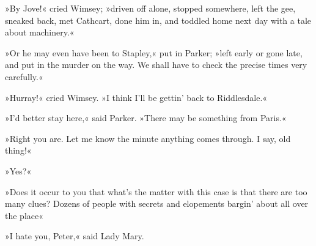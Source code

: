 »By Jove!« cried Wimsey; »driven off alone, stopped somewhere, left the gee, sneaked back, met Cathcart, done him in, and toddled home next day with a tale about machinery.«

»Or he may even have been to Stapley,« put in Parker; »left early or gone late, and put in the murder on the way. We shall have to check the precise times very carefully.«

»Hurray!« cried Wimsey. »I think I'll be gettin' back to Riddlesdale.«

»I'd better stay here,« said Parker. »There may be something from Paris.«

»Right you are. Let me know the minute anything comes through. I say, old thing!«

»Yes?«

»Does it occur to you that what's the matter with this case is that there are too many clues? Dozens of people with secrets and elopements bargin' about all over the place\longdash«

»I hate you, Peter,« said Lady Mary.
